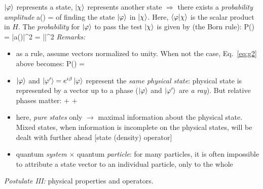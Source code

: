 \documentclass[12pt]{article}
\begin{document}
$\ket{\varphi}$ represents a state,
$\ket{\chi}$ represents another state $\Rightarrow$
there exists a \emph{probability amplitude}
\be
a(\varphi \to \chi) = \bra{\chi}\ket{\varphi}
\ee
of finding the state $\ket{\varphi}$ in $\ket{\chi}$. Here,
$\bra{\varphi}\ket{\chi}$ is the scalar product in $H$.
The \emph{probability} for $\ket{\varphi}$ to pass the test $\ket{\chi}$ is given by (the Born rule):
\setcounter{equation}{1}
\be
P(\varphi \to \chi) = |a(\varphi \to \chi)|^2 = |\bra{\chi}\ket{\varphi}|^2
\label{eq:g2}
\ee
\emph{Remarks:}
\begin{itemize}
\item as a rule, assume vectors normalized to unity.
When not the case, Eq.~\eqref{eq:g2} above becomes:
\be
P(\varphi \to \chi) = 
\ee
%
\item $\ket{\varphi}$ and $\ket{\varphi^\prime} = e^{i\beta}\ket{\varphi}$ represent the \emph{same
physical state}: physical state is represented by
a vector up to a phase ($\ket{\varphi}$ and $\ket{\varphi^\prime}$ are \emph{a ray}).
But relative phases matter:
\be
\lambda\ket{\varphi}+\mu\ket{\chi}
\lambda\ket{\varphi^\prime}+\mu\ket{\chi}
\ee
%
\item here, \emph{pure states} only $\to$ maximal information
about the physical state.
Mixed states, when information is incomplete
on the physical states, will be dealt with
further ahead [state (density) operator]
%
\item quantum \emph{system} $\times$ quantum \emph{particle}: for many
particles, it is often impossible to attribute a
state vector to an individual particle, only to
the whole
\end{itemize}

\emph{Postulate III:} physical properties and operators.
\end{document}
